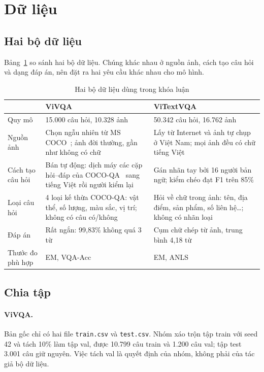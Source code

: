 \section{Dữ liệu}
\label{sec:met-data}

\subsection{Hai bộ dữ liệu}

Bảng~\ref{tab:met-datasets} so sánh hai bộ dữ liệu. Chúng khác nhau ở nguồn ảnh,
cách tạo câu hỏi và dạng đáp án, nên đặt ra hai yêu cầu khác nhau cho mô hình.

\begin{table}[htbp]
\caption{Hai bộ dữ liệu dùng trong khóa luận}
\label{tab:met-datasets}
\centering
\small
\begin{tabular}{p{}p{}p{}}
\toprule
\raggedright & \textbf{ViVQA}~\cite{tran2021vivqa} & \raggedright \textbf{ViTextVQA}~\cite{nguyen2024vitextvqa} \tabularnewline
\midrule
\raggedright Quy mô & \raggedright 15.000 câu hỏi, 10.328 ảnh & \raggedright 50.342 câu hỏi, 16.762 ảnh \tabularnewline
Nguồn ảnh & Chọn ngẫu nhiên từ MS COCO~\cite{lin2014coco}; ảnh đời thường, gần như không có chữ &
Lấy từ Internet và ảnh tự chụp ở Việt Nam; mọi ảnh đều có chữ tiếng Việt \\
Cách tạo câu hỏi & Bán tự động: dịch máy các cặp hỏi--đáp của COCO-QA~\cite{ren2015cocoqa} sang tiếng Việt rồi người kiểm lại &
Gán nhãn tay bởi 16 người bản ngữ; kiểm chéo đạt F1 trên 85\% \\
Loại câu hỏi & 4 loại kế thừa COCO-QA: vật thể, số lượng, màu sắc, vị trí; không có câu có/không &
Hỏi về chữ trong ảnh: tên, địa điểm, sản phẩm, số liên hệ\ldots; không có nhãn loại \\
\raggedright Đáp án & \raggedright Rất ngắn: 99,83\% không quá 3 từ & \raggedright Cụm chữ chép từ ảnh, trung bình 4,18 từ \tabularnewline
\raggedright Thước đo phù hợp & \raggedright EM, VQA-Acc & \raggedright EM, ANLS \tabularnewline
\bottomrule
\end{tabular}
\end{table}

\subsection{Chia tập}
\label{sec:met-split}

\paragraph{ViVQA.} Bản gốc chỉ có hai file \texttt{train.csv} và
\texttt{test.csv}. Nhóm xáo trộn tập train với seed 42 và tách 10\% làm tập val,
được 10.799 câu train và 1.200 câu val; tập test 3.001 câu giữ nguyên. Việc tách
val là quyết định của nhóm, không phải của tác giả bộ dữ liệu.

